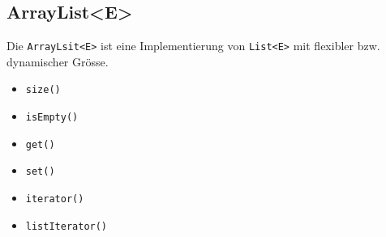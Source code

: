 \subsection{ArrayList<E>}
Die \lstinline{ArrayLsit<E>} ist eine Implementierung von 
\lstinline{List<E>} mit flexibler bzw. dynamischer Grösse.

\begin{itemize}
	\item \lstinline{size()}
	\item \lstinline{isEmpty()}
	\item \lstinline{get()}
	\item \lstinline{set()}
	\item \lstinline{iterator()}
	\item \lstinline{listIterator()}
\end{itemize}


